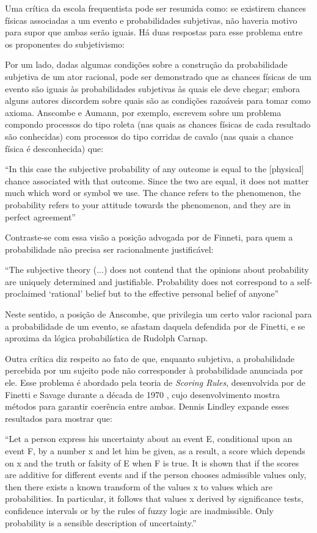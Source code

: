Uma crítica da escola frequentista pode ser resumida como: se existirem chances físicas associadas a um evento
e probabilidades subjetivas, não haveria motivo para supor que ambas serão iguais. Há duas respostas para esse problema 
entre os proponentes do subjetivismo:

Por um lado, dadas algumas condições sobre a construção da
probabilidade subjetiva de um ator racional, pode ser demonstrado que as chances físicas de um evento são iguais 
às probabilidades subjetivas às quais ele deve chegar; embora
alguns autores discordem sobre quais são as condições razoáveis para tomar como axioma. Anscombe e Aumann, por exemplo,
escrevem sobre um problema compondo processos do tipo roleta (nas quais as chances físicas de cada resultado são conhecidas) 
com processos do tipo corridas de cavalo (nas quais a chance física é desconhecida) que:

``In this case the subjective probability of any outcome is equal to the [physical] chance associated with that outcome.
Since the two are equal, it does not matter much which word or symbol we use. The
chance refers to the phenomenon, the probability refers to your attitude
towards the phenomenon, and they are in perfect agreement''\cite{Anscombe63}

Contraste-se com essa visão a posição advogada por de Finneti, para quem a probabilidade não precisa ser racionalmente
justificável:

``The subjective theory (...) does not contend that the opinions about probability are uniquely determined and
justifiable. Probability does not correspond to a self-proclaimed `rational' belief but to the effective personal
belief of anyone''\cite{deFinetti51}

Neste sentido, a posição de Anscombe, que privilegia um certo valor racional para a probabilidade de um evento,
se afastam daquela defendida por de Finetti, e se aproxima da lógica probabilística de Rudolph Carnap.

Outra crítica diz respeito ao fato de que, enquanto subjetiva, a probabilidade percebida por um sujeito pode não corresponder
à probabilidade anunciada por ele. Esse problema é abordado pela teoria de {\em Scoring Rules}, desenvolvida por
de Finetti e Savage durante a década de 1970 \cite{Lindley82}, cujo
desenvolvimento mostra métodos para garantir coerência entre ambas. Dennis Lindley expande esses resultados para mostrar que:

``Let a person express his uncertainty about an event E, conditional upon an event F, by a number x and let him be given, 
as a result, a score which depends on x and the truth or falsity of E when F is true. It is shown that if the scores are 
additive for different events and if the person chooses admissible values only, then there exists a known transform of the 
values x to values which are probabilities. In particular, it follows that values x derived by significance tests, confidence 
intervals or by the rules of fuzzy logic are inadmissible. Only probability is a sensible description of uncertainty.''
\cite{Lindley82}

